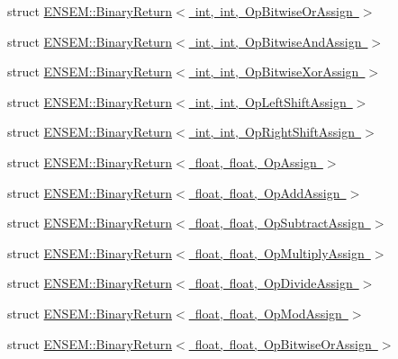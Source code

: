 \begin{DoxyCompactItemize}
\item 
struct \mbox{\hyperlink{structENSEM_1_1BinaryReturn_3_01int_00_01int_00_01OpBitwiseOrAssign_01_4}{E\+N\+S\+E\+M\+::\+Binary\+Return$<$ int, int, Op\+Bitwise\+Or\+Assign $>$}}
\item 
struct \mbox{\hyperlink{structENSEM_1_1BinaryReturn_3_01int_00_01int_00_01OpBitwiseAndAssign_01_4}{E\+N\+S\+E\+M\+::\+Binary\+Return$<$ int, int, Op\+Bitwise\+And\+Assign $>$}}
\item 
struct \mbox{\hyperlink{structENSEM_1_1BinaryReturn_3_01int_00_01int_00_01OpBitwiseXorAssign_01_4}{E\+N\+S\+E\+M\+::\+Binary\+Return$<$ int, int, Op\+Bitwise\+Xor\+Assign $>$}}
\item 
struct \mbox{\hyperlink{structENSEM_1_1BinaryReturn_3_01int_00_01int_00_01OpLeftShiftAssign_01_4}{E\+N\+S\+E\+M\+::\+Binary\+Return$<$ int, int, Op\+Left\+Shift\+Assign $>$}}
\item 
struct \mbox{\hyperlink{structENSEM_1_1BinaryReturn_3_01int_00_01int_00_01OpRightShiftAssign_01_4}{E\+N\+S\+E\+M\+::\+Binary\+Return$<$ int, int, Op\+Right\+Shift\+Assign $>$}}
\item 
struct \mbox{\hyperlink{structENSEM_1_1BinaryReturn_3_01float_00_01float_00_01OpAssign_01_4}{E\+N\+S\+E\+M\+::\+Binary\+Return$<$ float, float, Op\+Assign $>$}}
\item 
struct \mbox{\hyperlink{structENSEM_1_1BinaryReturn_3_01float_00_01float_00_01OpAddAssign_01_4}{E\+N\+S\+E\+M\+::\+Binary\+Return$<$ float, float, Op\+Add\+Assign $>$}}
\item 
struct \mbox{\hyperlink{structENSEM_1_1BinaryReturn_3_01float_00_01float_00_01OpSubtractAssign_01_4}{E\+N\+S\+E\+M\+::\+Binary\+Return$<$ float, float, Op\+Subtract\+Assign $>$}}
\item 
struct \mbox{\hyperlink{structENSEM_1_1BinaryReturn_3_01float_00_01float_00_01OpMultiplyAssign_01_4}{E\+N\+S\+E\+M\+::\+Binary\+Return$<$ float, float, Op\+Multiply\+Assign $>$}}
\item 
struct \mbox{\hyperlink{structENSEM_1_1BinaryReturn_3_01float_00_01float_00_01OpDivideAssign_01_4}{E\+N\+S\+E\+M\+::\+Binary\+Return$<$ float, float, Op\+Divide\+Assign $>$}}
\item 
struct \mbox{\hyperlink{structENSEM_1_1BinaryReturn_3_01float_00_01float_00_01OpModAssign_01_4}{E\+N\+S\+E\+M\+::\+Binary\+Return$<$ float, float, Op\+Mod\+Assign $>$}}
\item 
struct \mbox{\hyperlink{structENSEM_1_1BinaryReturn_3_01float_00_01float_00_01OpBitwiseOrAssign_01_4}{E\+N\+S\+E\+M\+::\+Binary\+Return$<$ float, float, Op\+Bitwise\+Or\+Assign $>$}}

\end{DoxyCompactItemize}
